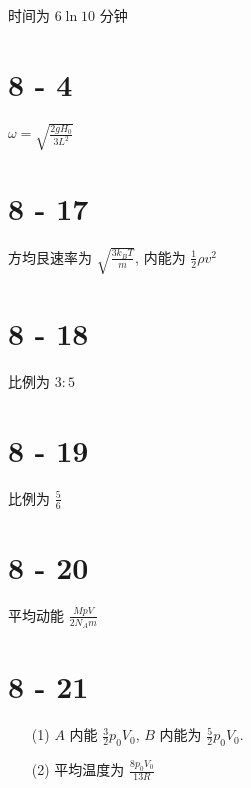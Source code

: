 \documentclass{article}
\begin{document}
时间为 $6\ln 10$ 分钟

\section*{8 - 4}

$\omega = \sqrt{\frac{2gH_0}{3L^2}}$

\section*{8 - 17}

方均艮速率为 $\sqrt{\frac{3k_BT}{m}}$, 内能为 $\frac{1}{2}\rho v^2$

\section*{8 - 18}

比例为 $3 : 5$

\section*{8 - 19}

比例为 $\frac{5}{6}$

\section*{8 - 20}

平均动能 $\frac{MpV}{2N_Am}$

\section*{8 - 21}

\begin{itemize}
    \item [(1)] $A$ 内能 $\frac{3}{2}p_0V_0$, $B$ 内能为 $\frac{5}{2}p_0V_0$.
    \item [(2)] 平均温度为 $\frac{8p_0V_0}{13R}$
\end{itemize}
\end{document}
